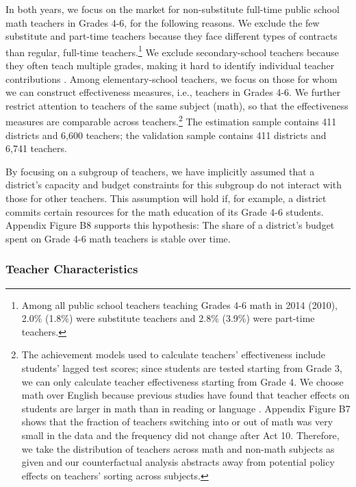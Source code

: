 \documentclass[notitlepage,12pt]{article}%
\begin{document}
In both years, we focus on the market for non-substitute full-time public
school math teachers in Grades 4-6, for the following reasons. We exclude the
few substitute and part-time teachers because they face different types of
contracts than regular, full-time teachers.\footnote{Among all public school
teachers teaching Grades 4-6 math in 2014 (2010), 2.0\% (1.8\%) were
substitute teachers and 2.8\% (3.9\%) were part-time teachers.} We exclude
secondary-school teachers because they often teach multiple grades, making it
hard to identify individual teacher contributions
\citep{kane2008estimating,chetty2014measuring}. Among elementary-school
teachers, we focus on those for whom we can construct effectiveness measures,
i.e., teachers in Grades 4-6. We further restrict attention to teachers of the
same subject (math), so that the effectiveness measures are comparable across
teachers.\footnote{The achievement models used to calculate teachers'
effectiveness include students' lagged test scores; since students are tested
starting from Grade 3, we can only calculate teacher effectiveness starting
from Grade 4. We choose math over English because previous studies have found
that teacher effects on students are larger in math than in reading or
language
\citep[e.g. ][]{rivkin2005teachers,kane2008estimating,chetty2014measuring}.
Appendix Figure B7 shows that the fraction of teachers switching into
or out of math was very small in the data and the frequency did not change
after Act 10. Therefore, we take the distribution of teachers across math and
non-math subjects as given and our counterfactual analysis abstracts away from
potential policy effects on teachers' sorting across subjects.} The estimation
sample contains 411 districts and 6,600 teachers; the validation sample
contains 411 districts and 6,741 teachers.

By focusing on a subgroup of teachers, we have implicitly assumed that a
district's capacity and budget constraints for this subgroup do not interact
with those for other teachers. This assumption will hold if, for example, a
district commits certain resources for the math education of its Grade 4-6
students. Appendix Figure B8 supports this hypothesis: The share of a
district's budget spent on Grade 4-6 math teachers is stable over time.

\subsubsection{Teacher Characteristics\label{teacherX}}
\end{document}
